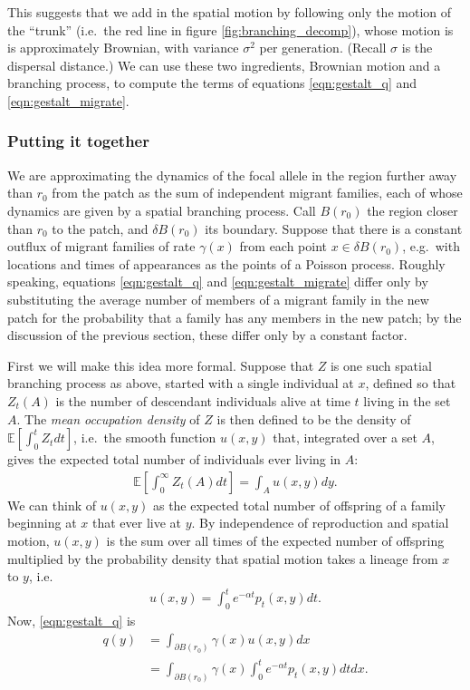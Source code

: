 \documentclass{article}
\newcommand{\E}{\mathbb{E}}
\begin{document}
This suggests that we add in the spatial motion by following only the motion of the ``trunk''
(i.e.\ the red line in figure \ref{fig:branching_decomp}),
whose motion is is approximately Brownian, with variance $\sigma^2$ per generation.
(Recall $\sigma$ is the dispersal distance.)
We can use these two ingredients, Brownian motion and a branching process, 
to compute the terms of equations \eqref{eqn:gestalt_q} and \eqref{eqn:gestalt_migrate}.


\subsubsection*{Putting it together}

We are approximating the dynamics of the focal allele in the region further away than $r_0$ from the patch
as the sum of independent migrant families, each of whose dynamics are given by a spatial branching process.
Call $B(r_0)$ the region closer than $r_0$ to the patch, and $\delta B(r_0)$ its boundary.
Suppose that there is a constant outflux of migrant families of rate $\gamma(x)$ from each point $x \in \delta B(r_0)$,
e.g.\ with locations and times of appearances as the points of a Poisson process.
Roughly speaking, equations \eqref{eqn:gestalt_q} and \eqref{eqn:gestalt_migrate}
differ only by substituting the average number of members of a migrant family in the new patch
for the probability that a family has any members in the new patch;
by the discussion of the previous section, these differ only by a constant factor.

First we will make this idea more formal.
Suppose that $Z$ is one such spatial branching process as above, started with a single individual at $x$,
defined so that $Z_t(A)$ is the number of descendant individuals alive at time $t$ living in the set $A$.
The \emph{mean occupation density} of $Z$ is then defined to be the density of $\E[\int_0^t Z_t dt]$,
i.e.\ the smooth function $u(x,y)$ that, integrated over a set $A$, 
gives the expected total number of individuals ever living in $A$:
\begin{align} \label{eqn:occupation_density_defn}
    \E\left[ \int_0^\infty Z_t(A) dt \right] = \int_A u(x,y) dy .
\end{align}
We can think of $u(x,y)$ as the expected total number of offspring of a family beginning at $x$
that ever live at $y$.
By independence of reproduction and spatial motion,
$u(x,y)$ is the sum over all times of the expected number of offspring
multiplied by the probability density that spatial motion takes a lineage from $x$ to $y$,
i.e.\
\begin{align}
    u(x,y) = \int_0^t e^{-\alpha t} p_t(x,y) dt .
\end{align}
Now, \eqref{eqn:gestalt_q} is
\begin{align}
    q(y) &= \int_{\partial B(r_0)} \gamma(x) u(x,y) dx  \\
         &= \int_{\partial B(r_0)} \gamma(x) \int_0^t e^{-\alpha t} p_t(x,y) dt dx .
\end{align}
\end{document}
